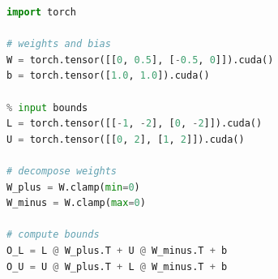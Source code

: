 \documentclass[oneside,11pt,dvipsnames]{book}
\numberwithin{equation}{section}
\theoremstyle{definition}
\theoremstyle{remark}
\newcommand{\tvn}[1]{\iftoggle{usecomment}{{\color{red}{[TVN]: #1}}}{}}
\newcommand{\hd}[1]{\iftoggle{usecomment}{{\color{blue}{[HD]: #1}}}{}}
\newcommand{\tool}{\texttt{NeuralSAT}}
\begin{document}
\begin{lstlisting}[language=Python]
import torch

# weights and bias
W = torch.tensor([[0, 0.5], [-0.5, 0]]).cuda()
b = torch.tensor([1.0, 1.0]).cuda()

% input bounds
L = torch.tensor([[-1, -2], [0, -2]]).cuda()
U = torch.tensor([[0, 2], [1, 2]]).cuda()

# decompose weights
W_plus = W.clamp(min=0)
W_minus = W.clamp(max=0)

# compute bounds
O_L = L @ W_plus.T + U @ W_minus.T + b
O_U = U @ W_plus.T + L @ W_minus.T + b

\end{lstlisting}











\end{document}
